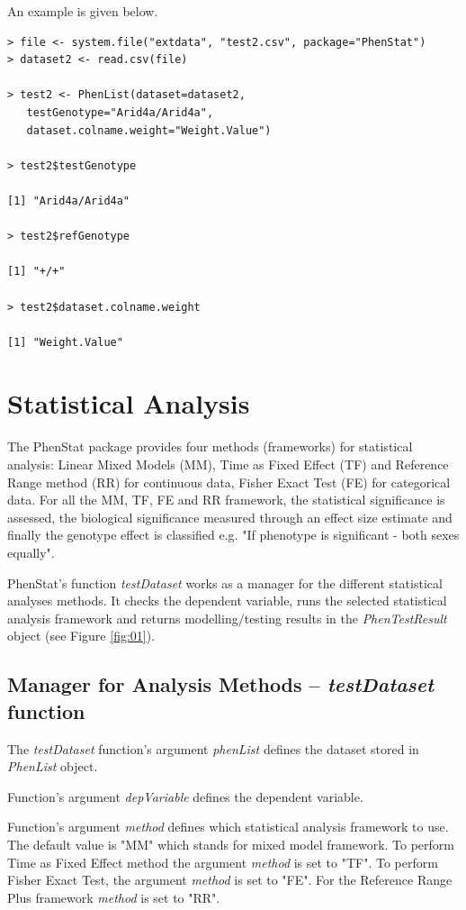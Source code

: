 \documentclass[12pt,a4paper]{article}
\begin{document}
An example is given below.


\begingroup
    \fontsize{8pt}{12pt}\selectfont
\begin{verbatim}
> file <- system.file("extdata", "test2.csv", package="PhenStat") 
> dataset2 <- read.csv(file)

> test2 <- PhenList(dataset=dataset2,
   testGenotype="Arid4a/Arid4a",
   dataset.colname.weight="Weight.Value")

> test2$testGenotype

[1] "Arid4a/Arid4a"

> test2$refGenotype

[1] "+/+"

> test2$dataset.colname.weight

[1] "Weight.Value"
\end{verbatim}
\endgroup

\section{Statistical Analysis}
The PhenStat package provides four methods (frameworks) for statistical analysis: Linear Mixed Models (MM), Time as Fixed Effect (TF) and Reference Range method (RR) for continuous data, Fisher Exact Test (FE) for categorical data. For all the MM, TF, FE and RR framework, 
the statistical significance is assessed, the biological significance measured through an effect size estimate and finally the genotype effect is classified e.g. "If phenotype is significant - both sexes equally".  


PhenStat's function \textit{testDataset} works as a manager for the different statistical analyses methods. It checks the dependent variable, runs the selected statistical analysis framework and
 returns modelling\slash testing results in the \textit{PhenTestResult} object (see Figure \ref{fig:01}). 

\subsection{Manager for Analysis Methods -- \textit{testDataset} function}
The \textit{testDataset} function's argument \textit{phenList} defines the dataset stored in \textit{PhenList} object.

Function's argument \textit{depVariable} defines the dependent variable.

Function's argument \textit{method} defines which statistical analysis framework to use. 
The default value is "MM" which stands for mixed model framework. To perform Time as Fixed Effect method the argument \textit{method} is set to "TF". To perform Fisher Exact Test, the argument \textit{method} is set to "FE". For the Reference Range Plus framework \textit{method} is set to "RR".
\end{document}

